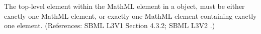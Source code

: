 The top-level element within the MathML  element in a
\FunctionDefinition object,  must be either exactly one MathML 
element, or exactly one MathML  element containing exactly
one  element.  (References: SBML L3V1 Section 4.3.2; SBML L3V2
.)
